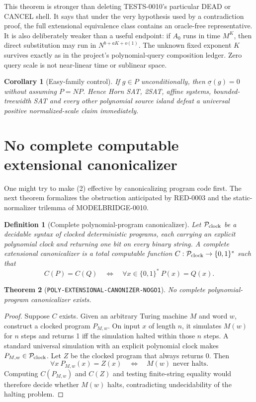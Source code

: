 \documentclass[11pt]{article}
\newtheorem{definition}{Definition}
\newtheorem{theorem}{Theorem}
\newtheorem{corollary}[theorem]{Corollary}
\begin{document}
This theorem is stronger than deleting TESTS-0010's particular DEAD or
CANCEL shell.  It says that under the very hypothesis used by a contradiction
proof, the full extensional equivalence class contains an oracle-free
representative.  It is also deliberately weaker than a useful endpoint:
if $A_0$ runs in time $M^K$, then direct substitution may run in
$N^{b+aK+o(1)}$.  The unknown fixed exponent $K$ survives exactly as in the
project's polynomial-query composition ledger.  Zero query scale is not
near-linear time or sublinear space.

\begin{corollary}[Easy-family control]
If $g\in P$ unconditionally, then $\underline\sigma(g)=0$ without assuming
$P=NP$.  Hence Horn SAT, 2SAT, affine systems, bounded-treewidth SAT and every
other polynomial source island defeat a universal positive normalized-scale
claim immediately.
\end{corollary}

\section{No complete computable extensional canonicalizer}

One might try to make (2) effective by canonicalizing program code first.
The next theorem formalizes the obstruction anticipated by RED-0003 and the
static-normalizer trilemma of MODELBRIDGE-0010.

\begin{definition}[Complete polynomial-program canonicalizer]
Let $\mathcal P_{\rm clock}$ be a decidable syntax of clocked deterministic
programs, each carrying an explicit polynomial clock and returning one bit on
every binary string.  A complete extensional canonicalizer is a total
computable function $C:\mathcal P_{\rm clock}\to\{0,1\}^*$ such that
\[
 C(P)=C(Q)\quad\Longleftrightarrow\quad
 \forall x\in\{0,1\}^*\ P(x)=Q(x).
 \tag{5}
\]
\end{definition}

\begin{theorem}[\texttt{POLY-EXTENSIONAL-CANONIZER-NOGO1}]
No complete polynomial-program canonicalizer exists.
\end{theorem}

\begin{proof}
Suppose $C$ exists.  Given an arbitrary Turing machine $M$ and word $w$,
construct a clocked program $P_{M,w}$.  On input $x$ of length $n$, it
simulates $M(w)$ for $n$ steps and returns 1 iff the simulation halted within
those $n$ steps.  A standard universal simulation with an explicit
polynomial clock makes $P_{M,w}\in\mathcal P_{\rm clock}$.  Let $Z$ be the
clocked program that always returns 0.  Then
\[
 \forall x\ P_{M,w}(x)=Z(x)
 \quad\Longleftrightarrow\quad M(w)\text{ never halts}.
 \tag{6}
\]
Computing $C(P_{M,w})$ and $C(Z)$ and testing finite-string equality would
therefore decide whether $M(w)$ halts, contradicting undecidability of the
halting problem.
\end{proof}
\end{document}
